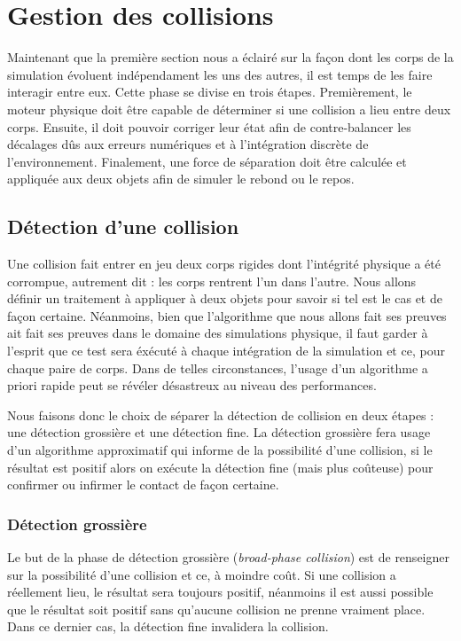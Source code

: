 \section{Gestion des collisions}

Maintenant que la première section nous a éclairé sur la façon dont
les corps de la simulation évoluent indépendament les uns des autres,
il est temps de les faire interagir entre eux. Cette phase se divise
en trois étapes. Premièrement, le moteur physique doit être capable de
déterminer si une collision a lieu entre deux corps. Ensuite, il doit
pouvoir corriger leur état afin de contre-balancer les décalages dûs
aux erreurs numériques et à l'intégration discrète de
l'environnement. Finalement, une force de séparation doit être
calculée et appliquée aux deux objets afin de simuler le rebond ou le
repos.

\subsection{Détection d'une collision}

Une collision fait entrer en jeu deux corps rigides dont l'intégrité
physique a été corrompue, autrement dit : les corps rentrent l'un dans
l'autre. Nous allons définir un traitement à appliquer à deux objets
pour savoir si tel est le cas et de façon certaine. Néanmoins, bien
que l'algorithme que nous allons fait ses preuves ait fait ses preuves
dans le domaine des simulations physique, il faut garder à l'esprit
que ce test sera éxécuté à chaque intégration de la simulation et ce,
pour chaque paire de corps. Dans de telles circonstances, l'usage d'un
algorithme a priori rapide peut se révéler désastreux au niveau des
performances.

Nous faisons donc le choix de séparer la détection de collision en
deux étapes : une détection grossière et une détection fine. La
détection grossière fera usage d'un algorithme approximatif qui
informe de la possibilité d'une collision, si le résultat est positif
alors on exécute la détection fine (mais plus coûteuse) pour confirmer
ou infirmer le contact de façon certaine.

\subsubsection{Détection grossière}

Le but de la phase de détection grossière (\textit{broad-phase
  collision}) est de renseigner sur la possibilité d'une collision et
ce, à moindre coût. Si une collision a réellement lieu, le résultat
sera toujours positif, néanmoins il est aussi possible que le résultat
soit positif sans qu'aucune collision ne prenne vraiment place. Dans
ce dernier cas, la détection fine invalidera la collision.

